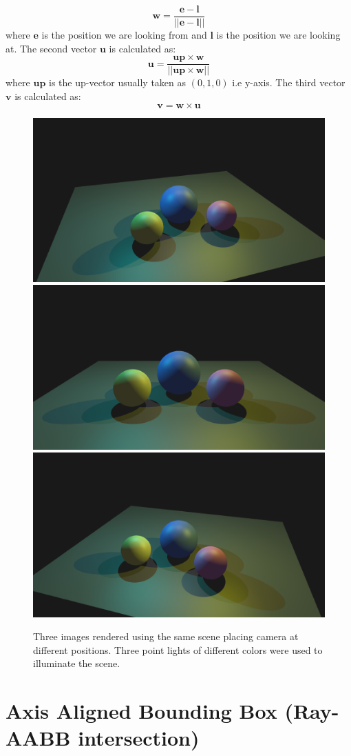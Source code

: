 \documentclass[11pt,a4paper]{article}
\begin{document}
	\begin{equation}
		\boldsymbol{w} = \frac{\boldsymbol{e} - \boldsymbol{l}}{||\boldsymbol{e} - \boldsymbol{l}||}
	\end{equation}
	\noindent
	where $\boldsymbol{e}$ is the position we are looking from and $\boldsymbol{l}$ is the position we are looking at. The second vector $\boldsymbol{u}$ is calculated as:
	\begin{equation}
		\boldsymbol{u} = \frac{\boldsymbol{up} \times \boldsymbol{w}}{||\boldsymbol{up} \times \boldsymbol{w}||}
	\end{equation}
	where $\boldsymbol{up}$ is the up-vector usually taken as $(0, 1, 0)$ i.e y-axis. The third vector $\boldsymbol{v}$ is calculated as:
	\begin{equation}
		\boldsymbol{v} = \boldsymbol{w} \times \boldsymbol{u}
	\end{equation}
	\begin{figure}[H]
		\centering
		\captionsetup{justification=centering}
		\includegraphics[width=.3\textwidth]{camera3}\quad
		\includegraphics[width=.3\textwidth]{camera1}\quad
		\includegraphics[width=.3\textwidth]{camera2}\quad
		\caption{Three images rendered using the same scene placing camera at different positions. Three point lights of different colors were used to illuminate the scene.}
	\end{figure}
	
	\section{Axis Aligned Bounding Box (Ray-AABB intersection)}
\end{document}
